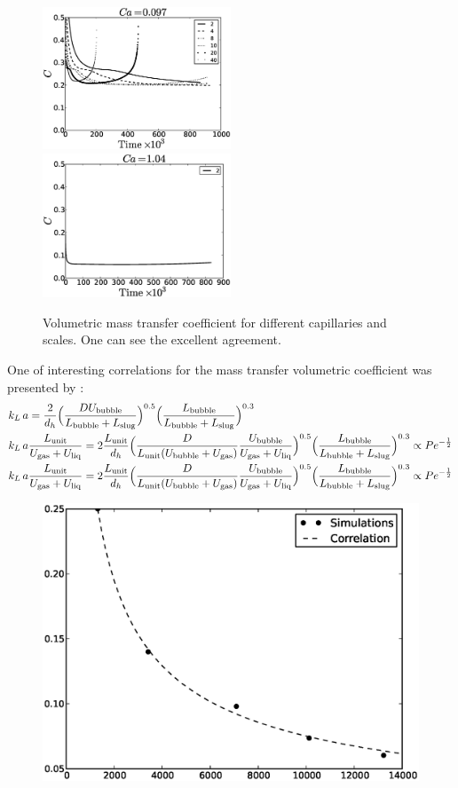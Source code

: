 \documentclass{article}
\newcommand{\beqal}{\begin{equation}\begin{aligned}}
\newcommand{\feqal}{\end{aligned}\end{equation}}
\newcommand{\vol}{k_L\,a}
\newcommand{\lbubble}{L_{\mathrm{bubble}}}
\newcommand{\lunit}{L_{\mathrm{unit}}}
\newcommand{\lslug}{L_{\mathrm{slug}}}
\newcommand{\ububble}{U_{\mathrm{bubble}}}
\newcommand{\uliq}{U_{\mathrm{liq}}}
\newcommand{\ugas}{U_{\mathrm{gas}}}
\begin{document}
\begin{figure}
\includegraphics[width=0.5\textwidth]{Figures/aver_conc_scale_ca097.eps}\\
\includegraphics[width=0.5\textwidth]{Figures/aver_conc_scale_ca14.eps}\\
\caption{Volumetric mass transfer coefficient for different capillaries and scales. One can see the
excellent agreement. \label{fig:aver:conc:different:capillaries}}
\end{figure}
One of interesting correlations for the mass transfer volumetric coefficient was presented by
\citet{yue-mass}:
\beqal
&\vol=\frac{2}{d_h}\Bigl(\frac{D \ububble}{\lbubble+\lslug}\Bigr)^{0.5}
\Bigl(\frac{\lbubble}{\lbubble+\lslug}\Bigr)^{0.3}\\
&\vol \frac{\lunit}{\ugas+\uliq}=2\frac{\lunit}{d_h} \Bigl(\frac{D 
}{\lunit (\ububble+\ugas)} \frac{\ububble}{\ugas+\uliq}\Bigr)^{0.5}
\Bigl(\frac{\lbubble}{\lbubble+\lslug}\Bigr)^{0.3} \propto Pe^{-\frac{1}{2}}\\
&\vol \frac{\lunit}{\ugas+\uliq}=2\frac{\lunit}{d_h} \Bigl(\frac{D 
}{\lunit (\ububble+\ugas)} \frac{\ububble}{\ugas+\uliq}\Bigr)^{0.5}
\Bigl(\frac{\lbubble}{\lbubble+\lslug}\Bigr)^{0.3} \propto Pe^{-\frac{1}{2}}
\feqal
\begin{figure}
\includegraphics[width=\textwidth]{Figures/volumetric_mass_peclet.eps}
\end{figure}
\end{document}

